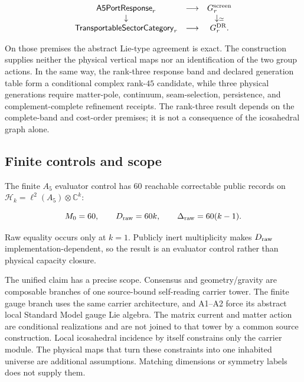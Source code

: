\[
\begin{array}{ccc}
\mathsf{A5PortResponse}_r & \longrightarrow & G_r^{\rm screen}\\
\downarrow & & \downarrow\scriptstyle{\simeq}\\
\mathsf{TransportableSectorCategory}_r & \longrightarrow & G_r^{\rm DR}.
\end{array}
\]

On those premises the abstract Lie-type agreement is exact. The construction
supplies neither the physical vertical maps nor an identification of the two
group actions. In the same way, the
rank-three response band and declared generation table form a conditional
complex rank-\(45\) candidate, while three physical generations require
matter-pole, continuum, seam-selection, persistence, and complement-complete
refinement receipts. The rank-three result depends on the complete-band and
cost-order premises; it is not a consequence of the icosahedral graph alone.

\subsection*{Finite controls and scope}

The finite \(A_5\) evaluator control has \(60\) reachable correctable public
records on \(\mathcal H_k=\ell^2(A_5)\otimes\mathbb C^k\):

\[
M_0=60,\qquad D_{\rm raw}=60k,\qquad
\Delta_{\rm raw}=60(k-1).
\]

Raw equality occurs only at \(k=1\). Publicly inert multiplicity makes
\(D_{\rm raw}\) implementation-dependent, so the result is an evaluator
control rather than physical capacity closure.

The unified claim has a precise scope. Consensus and geometry/gravity are
composable branches of one source-bound self-reading carrier tower. The
finite gauge branch uses the same carrier architecture, and A1--A2 force its
abstract local Standard Model gauge Lie algebra. The matrix current and matter
action are conditional realizations and are not joined to that tower by a
common source construction.
Local icosahedral incidence by itself constrains only the carrier module.
The physical maps that turn these constraints into one inhabited universe
are additional assumptions. Matching dimensions or symmetry labels does not
supply them.
